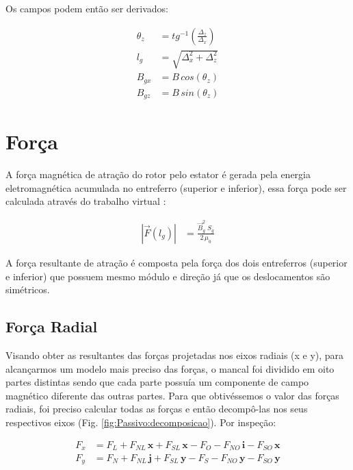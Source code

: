 Os campos podem então ser derivados:

\begin{align}
\theta_z &= tg^{-1}(\frac{\Delta_z}{\Delta_x}) \\
l_g &= \sqrt{\Delta_x^2 + \Delta_z^2} \\
B_{gx} &= B \, cos(\theta_z) \\
B_{gz} &= B \, sin(\theta_z) 
\end{align}


\section{Força}

A força magnética de atração do rotor pelo estator é gerada pela energia eletromagnética acumulada no entreferro (superior e inferior), essa força pode ser calculada através do trabalho virtual \citep{Chiba}:

\begin{align}
|\vec{F}(l_g)| &=  \frac{ \vec{B}_{g}^2 \; S_g}{2 \, \mu_0} \label{eq:passivo:Fx}
\end{align}

A força resultante de atração é composta pela força dos dois entreferros (superior e inferior) que possuem mesmo módulo e direção já que os deslocamentos são simétricos. 

\subsection{Força Radial} \label{subsection:forca:x}


Visando obter as resultantes das forças projetadas nos eixos radiais (x e y), para alcançarmos um modelo mais preciso das forças, o mancal foi dividido em oito partes distintas sendo que cada parte possuía um componente de campo magnético diferente das outras partes. Para que obtivéssemos o valor das forças radiais, foi preciso calcular todas as forças e então decompô-las nos seus respectivos eixos (Fig. \ref{fig:Passivo:decomposicao}). Por inspeção:

\begin{align}
F_x &= F_{L} + F_{NL} \, \boldsymbol{x} + F_{SL} \, \boldsymbol{x} - F_{O} - F_{NO} \, \boldsymbol{i}  - F_{SO} \, \boldsymbol{x} \label{eq:p:F:resultante:x} \\
F_y &= F_{N} + F_{NL} \, \boldsymbol{j} + F_{SL} \, \boldsymbol{y} - F_{S} - F_{NO} \, \boldsymbol{y}  - F_{SO} \, \boldsymbol{y}
\label{eq:p:F:resultante:y} 
\end{align}


